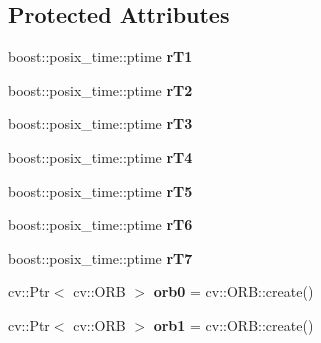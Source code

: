 \subsection*{Protected Attributes}
\begin{DoxyCompactItemize}
\item 
\mbox{\label{classov__core_1_1TrackDescriptor_a8f3173b664e11dda898fda7d5ba46b71}} 
boost\+::posix\+\_\+time\+::ptime {\bfseries r\+T1}
\item 
\mbox{\label{classov__core_1_1TrackDescriptor_a4c41176773ce2a6545f2f8e4f85a1f7b}} 
boost\+::posix\+\_\+time\+::ptime {\bfseries r\+T2}
\item 
\mbox{\label{classov__core_1_1TrackDescriptor_a9d95fac250a57212caec71b5f5ad8aca}} 
boost\+::posix\+\_\+time\+::ptime {\bfseries r\+T3}
\item 
\mbox{\label{classov__core_1_1TrackDescriptor_ab14bc7cb2ca403d568109d52070cf081}} 
boost\+::posix\+\_\+time\+::ptime {\bfseries r\+T4}
\item 
\mbox{\label{classov__core_1_1TrackDescriptor_ad7263a9b3c359a3009c02ba5184a3090}} 
boost\+::posix\+\_\+time\+::ptime {\bfseries r\+T5}
\item 
\mbox{\label{classov__core_1_1TrackDescriptor_ae5bc6307841a28a9b3d8496b2fa6e073}} 
boost\+::posix\+\_\+time\+::ptime {\bfseries r\+T6}
\item 
\mbox{\label{classov__core_1_1TrackDescriptor_aa18bcb26c70ba3d269e7e171ada7eab3}} 
boost\+::posix\+\_\+time\+::ptime {\bfseries r\+T7}
\item 
\mbox{\label{classov__core_1_1TrackDescriptor_ad11366d838ae47600500543a56b651c3}} 
cv\+::\+Ptr$<$ cv\+::\+O\+RB $>$ {\bfseries orb0} = cv\+::\+O\+R\+B\+::create()
\item 
\mbox{\label{classov__core_1_1TrackDescriptor_aa7c9211e95e5e3e3b8fbeef4795ffdb9}} 
cv\+::\+Ptr$<$ cv\+::\+O\+RB $>$ {\bfseries orb1} = cv\+::\+O\+R\+B\+::create()

\end{DoxyCompactItemize}
